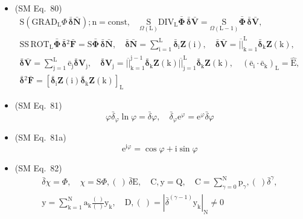 \documentclass[12pt]{article}
\begin{document}
\begin{itemize}[label={},leftmargin=0pt]
    \item (SM Eq.\ 80) 
    \[
    \begin{gathered}
    \mathrm{S}(\mathrm{GRAD}_\mathrm{L} \Phi \,\bar{\bm{\delta}}\bar{\mathbf{N}});\mathrm{n} = \mathrm{const}, \quad \underset{\Omega(\mathrm{L})}{\mathrm{S}}\mathrm{DIV}_\mathrm{L} \bar{\bm{\Phi}}\,\bar{\bm{\delta}}\bar{\mathbf{V}} = \underset{\Omega(\mathrm{L}-1)}{\mathrm{S}}\bar{\bm{\Phi}}\,\bar{\bm{\delta}}\bar{\mathbf{V}}, \\
    \mathrm{SS}\,\mathrm{ROT}_\mathrm{L} \bar{\bm{\Phi}}\,\bar{\bm{\delta}}{}^2\bar{\mathbf{F}} = \mathrm{S}\bar{\bm{\Phi}}\,\bar{\bm{\delta}}\bar{\mathbf{N}}, \quad \bar{\bm{\delta}}\bar{\mathbf{N}} = \sum_{\mathrm{i}=1}^\mathrm{L} \bar{\bm{\delta}}_\mathrm{i} \mathbf{Z}(\mathrm{i}), \quad \bar{\bm{\delta}}\bar{\mathbf{V}} = \overline{||}_{\mathrm{k}=1}^\mathrm{L} \bar{\bm{\delta}}_\mathrm{k} \mathbf{Z}(\mathrm{k}), \\
    \bar{\bm{\delta}}\bar{\mathbf{V}} = \sum_{\mathrm{j}=1}^\mathrm{L} \bar{\mathrm{e}}_\mathrm{j} \bar{\bm{\delta}}\mathbf{V}_\mathrm{j}, \quad \bar{\bm{\delta}}\mathbf{V}_\mathrm{j} = \overline{||}_{\mathrm{k}=1}^{\mathrm{j}-1}\bar{\bm{\delta}}_\mathrm{k} \mathbf{Z}(\mathrm{k}) \overline{||}_{\mathrm{j}=1}^\mathrm{L} \bar{\bm{\delta}}_\mathrm{k} \mathbf{Z}(\mathrm{k}), \quad (\bar{\mathrm{e}}_\mathrm{i} \cdot \bar{\mathrm{e}}_\mathrm{k})_\mathrm{L} = \hat{\mathrm{E}}, \\
    \bar{\bm{\delta}}{}^2\bar{\mathbf{F}} = \left[ \bar{\bm{\delta}}_\mathrm{i} \mathbf{Z}(\mathrm{i}) \bar{\bm{\delta}}_\mathrm{k} \mathbf{Z}(\mathrm{k}) \right]_\mathrm{L}
    \end{gathered}
    \]

    \item (SM Eq.\ 81) 
    \[
    \varphi \bar{\delta}_\varphi \ln \varphi = \bar{\delta} \varphi, \quad \bar{\delta}_\varphi \mathrm{e}^\varphi = \mathrm{e}^\varphi \bar{\delta}\varphi
    \]

    \item (SM Eq.\ 81a) 
    \[
    \mathrm{e}^{\mathrm{i}\varphi} = \cos\varphi + \mathrm{i}\sin\varphi
    \]

    \item (SM Eq.\ 82) 
    \[
    \begin{gathered}
    \bar{\delta}\chi = \Phi, \quad \chi = \mathrm{S}\Phi, (\ )\,\bar{\delta}\mathrm{E}, \quad \mathrm{C}, \mathrm{y} = \mathrm{Q}, \quad \mathrm{C} = \sum_{\gamma=0}^\mathrm{N} \mathrm{p}_\gamma, (\ )\bar{\delta}^\gamma, \\
    \mathrm{y} = \sum_{\mathrm{k}=1}^\mathrm{N} \mathrm{a_k} \frac{(\ )}{(\ )} \mathrm{y_k}, \quad \mathrm{D}, (\ ) = \left| \bar{\delta}^{(\gamma-1)} \mathrm{y_k} \right|_\mathrm{N} \ne 0
    \end{gathered}
    \]


\end{itemize}
\end{document}
